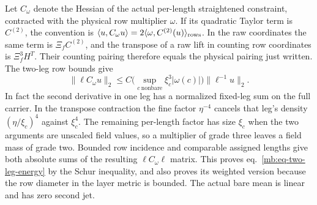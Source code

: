 \documentclass[11pt,letterpaper,reqno]{amsart}
\numberwithin{equation}{section}
\renewcommand{\eqref}[1]{\textup{eq.~\ref{#1}}}
\theoremstyle{definition}
\theoremstyle{remark}
\begin{document}
Let \(C_\omega\) denote the Hessian of the actual per-length straightened constraint, contracted with the physical row multiplier \(\omega\). If its quadratic Taylor term is \(C^{(2)}\), the convention is
\(\langle u,C_\omega u\rangle=2\langle\omega,C^{(2)}(u)\rangle_{\rm rows}\).
In the raw coordinates the same term is \(\Xi_f C^{(2)}\), and the transpose of a raw lift in counting row coordinates is \(\Xi_f^3 H^T\). Their counting pairing therefore equals the physical pairing just written. The two-leg row bounds give
\begin{equation}\label{mb:eq-two-leg-energy}
 \|\ell C_\omega u\|_2
       \le C\Big(\sup_{c\ \mathrm{nonbare}}\xi_c^3|\omega(c)|\Big)
                         \|\ell^{-1}u\|_2 .
\end{equation}
In fact the second derivative in one leg has a normalized fixed-leg sum on the full carrier. In the transpose contraction the fine factor \(\eta^{-4}\) cancels that leg's density \((\eta/\xi_c)^4\) against \(\xi_c^4\). The remaining per-length factor has size \(\xi_c\) when the two arguments are unscaled field values, so a multiplier of grade three leaves a field mass of grade two. Bounded row incidence and comparable assigned lengths give both absolute sums of the resulting \(\ell C_\omega\ell\) matrix. This proves \eqref{mb:eq-two-leg-energy} by the Schur inequality, and also proves its weighted version because the row diameter in the layer metric is bounded. The actual bare mean is linear and has zero second jet.
\end{document}

